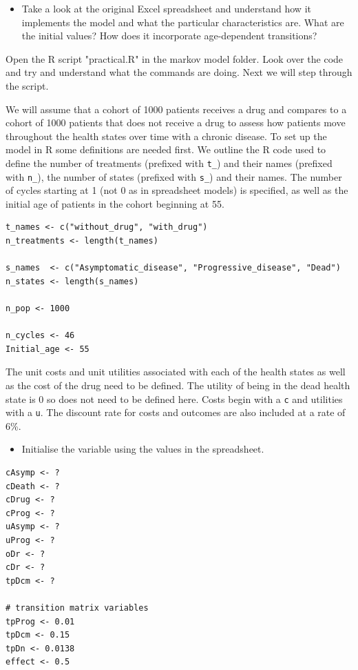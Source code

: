 \begin{itemize}
\item Take a look at the original Excel spreadsheet and understand how it implements the model and what the particular characteristics are. What are the initial values? How does it incorporate age-dependent transitions?
\end{itemize}


Open the R script "practical.R" in the markov model folder.
Look over the code and try and understand what the commands are doing.
Next we will step through the script.

We will assume that a cohort of 1000 patients receives a drug and compares to a cohort of 1000 patients that does not receive a drug to assess how patients move throughout the health states over time with a chronic disease.
To set up the model in R some definitions are needed first. We outline the R code used to define the number of treatments (prefixed with \texttt{t\_}) and their names (prefixed with \texttt{n\_}), the number of states (prefixed with \texttt{s\_}) and their names. The number of cycles starting at 1 (not 0 as in spreadsheet models) is specified, as well as the initial age of patients in the cohort beginning at 55.

\begin{verbatim}
t_names <- c("without_drug", "with_drug")
n_treatments <- length(t_names)

s_names  <- c("Asymptomatic_disease", "Progressive_disease", "Dead")
n_states <- length(s_names)

n_pop <- 1000

n_cycles <- 46
Initial_age <- 55
\end{verbatim}

The unit costs and unit utilities associated with each of the health states as well as the cost of the drug need to be defined.
The utility of being in the dead health state is 0 so does not need to be defined here.
Costs begin with a \texttt{c} and utilities with a \texttt{u}. The discount rate for costs and outcomes are also included at a rate of 6\%.

\begin{itemize}
\item Initialise the variable using the values in the spreadsheet.
\end{itemize}

\begin{verbatim}
cAsymp <- ?
cDeath <- ?
cDrug <- ?
cProg <- ?
uAsymp <- ?
uProg <- ?
oDr <- ?
cDr <- ?
tpDcm <- ?

# transition matrix variables
tpProg <- 0.01
tpDcm <- 0.15
tpDn <- 0.0138
effect <- 0.5
\end{verbatim}


